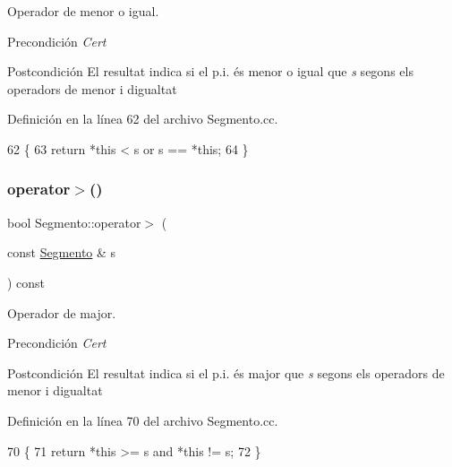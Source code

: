 Operador de menor o igual. 

\begin{DoxyPrecond}{Precondición}
{\itshape Cert} 
\end{DoxyPrecond}
\begin{DoxyPostcond}{Postcondición}
El resultat indica si el p.\+i. és menor o igual que {\itshape s} segons els operadors de menor i d\textquotesingle{}igualtat 
\end{DoxyPostcond}


Definición en la línea 62 del archivo Segmento.\+cc.


\begin{DoxyCode}
62                                                  \{
63   \textcolor{keywordflow}{return} *\textcolor{keyword}{this} < s or s == *\textcolor{keyword}{this};
64 \}
\end{DoxyCode}
\mbox{\label{class_segmento_a01c2aa376384c7a75ef22196db361d2e}} 
\subsubsection{\texorpdfstring{operator$>$()}{operator>()}}
{\footnotesize\ttfamily bool Segmento\+::operator$>$ (\begin{DoxyParamCaption}\item[{const \hyperlink{class_segmento}{Segmento} \&}]{s }\end{DoxyParamCaption}) const}



Operador de major. 

\begin{DoxyPrecond}{Precondición}
{\itshape Cert} 
\end{DoxyPrecond}
\begin{DoxyPostcond}{Postcondición}
El resultat indica si el p.\+i. és major que {\itshape s} segons els operadors de menor i d\textquotesingle{}igualtat 
\end{DoxyPostcond}


Definición en la línea 70 del archivo Segmento.\+cc.


\begin{DoxyCode}
70                                                 \{
71   \textcolor{keywordflow}{return} *\textcolor{keyword}{this} >= s and *\textcolor{keyword}{this} != s;
72 \}
\end{DoxyCode}
\mbox{\label{class_segmento_a74e0ca47b9bf2316a0f55351529380f6}} 
